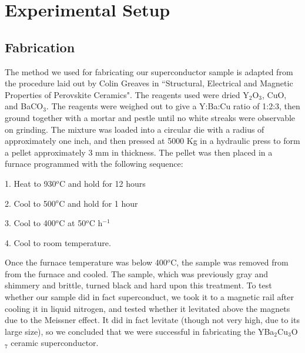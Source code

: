 \documentclass[aps,prl,twocolumn,groupedaddress]{revtex4}
\begin{document}
\section{Experimental Setup}
\subsection{Fabrication}
The method we used for fabricating our superconductor sample is adapted from the procedure laid out by Colin Greaves in ``Structural, Electrical and Magnetic Properties of Perovskite Ceramics"\cite{greaves}. The reagents used were dried Y$_{2}$O$_{3}$, CuO, and BaCO$_{3}$. The reagents were weighed out to give a Y:Ba:Cu ratio of 1:2:3, then ground together with a mortar and pestle until no white streaks were observable on grinding. The mixture was loaded into a circular die with a radius of approximately one inch, and then pressed at 5000 Kg in a hydraulic press to form a pellet approximately 3 mm in thickness. The pellet was then placed in a furnace programmed with the following sequence:

1. Heat to 930$^{o}$C and hold for 12 hours

2. Cool to 500$^{o}$C and hold for 1 hour

3. Cool to 400$^{o}$C at 50$^{o}$C h$^{-1}$

4. Cool to room temperature.

Once the furnace temperature was below 400$^{o}$C, the sample was removed from from the furnace and cooled. The sample, which was previously gray and shimmery and brittle, turned black and hard upon this treatment. To test whether our sample did in fact superconduct, we took it to a magnetic rail after cooling it in liquid nitrogen, and tested whether it levitated above the magnets due to the Meissner effect. It did in fact levitate (though not very high, due to its large size), so we concluded that we were successful in fabricating the YBa$_{2}$Cu$_{3}$O$_{7}$ ceramic superconductor.
\end{document}
